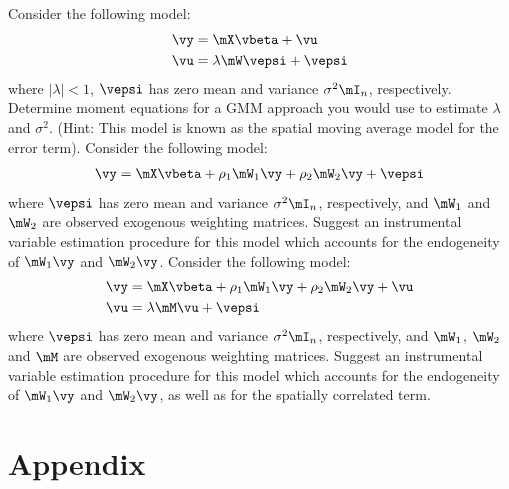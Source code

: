 \documentclass[english,12pt]{book}\usepackage[]{graphicx}\usepackage[]{xcolor}
\begin{document}
\begin{exercises}
    \exercise Consider the following model:
  		\begin{equation*}
  			\begin{aligned}
  				\vy & = \mX\vbeta + \vu \\
  				\vu & = \lambda\mW\vepsi + \vepsi
  			\end{aligned}
  		\end{equation*}
  		where $\left|\lambda\right| < 1$, $\vepsi$ has zero mean and variance $\sigma^2\mI_n$, respectively. Determine moment equations for a GMM approach you would use to estimate $\lambda$ and $\sigma^2$. (Hint: This model is known as the spatial moving average model for the error term).
  		\exercise Consider the following model:
        \begin{equation*}
        \begin{aligned}
        \vy  = \mX\vbeta + \rho_1\mW_1\vy + \rho_2\mW_2\vy+ \vepsi
        \end{aligned}
        \end{equation*}
        where $\vepsi$ has zero mean and variance $\sigma^2\mI_n$, respectively, and $\mW_1$ and $\mW_2$ are observed exogenous weighting matrices. Suggest an instrumental variable estimation procedure for this model which accounts for the endogeneity of $\mW_1\vy$ and $\mW_2\vy$. 
        \exercise Consider the following model:
    \begin{equation*}
    	\begin{aligned}
    		\vy & = \mX\vbeta + \rho_1\mW_1\vy + \rho_2\mW_2\vy+ \vu \\
    		\vu & = \lambda\mM\vu + \vepsi
    	\end{aligned}
    \end{equation*}
    where $\vepsi$ has zero mean and variance $\sigma^2\mI_n$, respectively, and $\mW_1$, $\mW_2$ and $\mM$ are observed exogenous weighting matrices. Suggest an instrumental variable estimation procedure for this model which accounts for the endogeneity of $\mW_1\vy$ and $\mW_2\vy$, as well as for the spatially correlated term. 
\end{exercises}   


\section*{Appendix}
\end{document}
